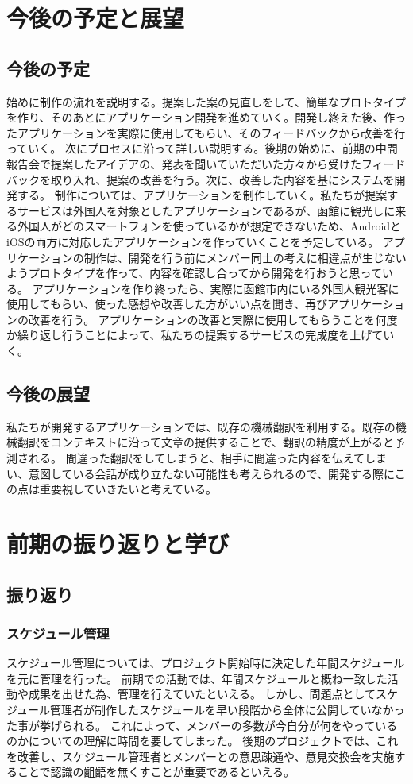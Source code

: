 \documentclass[12pt,papersize]{jsbook}
\begin{document}
\chapter{今後の予定と展望}

\section{今後の予定}
 始めに制作の流れを説明する。提案した案の見直しをして、簡単なプロトタイプを作り、そのあとにアプリケーション開発を進めていく。開発し終えた後、作ったアプリケーションを実際に使用してもらい、そのフィードバックから改善を行っていく。
次にプロセスに沿って詳しい説明する。後期の始めに、前期の中間報告会で提案したアイデアの、発表を聞いていただいた方々から受けたフィードバックを取り入れ、提案の改善を行う。次に、改善した内容を基にシステムを開発する。
制作については、アプリケーションを制作していく。私たちが提案するサービスは外国人を対象としたアプリケーションであるが、函館に観光しに来る外国人がどのスマートフォンを使っているかが想定できないため、AndroidとiOSの両方に対応したアプリケーションを作っていくことを予定している。
アプリケーションの制作は、開発を行う前にメンバー同士の考えに相違点が生じないようプロトタイプを作って、内容を確認し合ってから開発を行おうと思っている。
アプリケーションを作り終ったら、実際に函館市内にいる外国人観光客に使用してもらい、使った感想や改善した方がいい点を聞き、再びアプリケーションの改善を行う。
アプリケーションの改善と実際に使用してもらうことを何度か繰り返し行うことによって、私たちの提案するサービスの完成度を上げていく。

\section{今後の展望}
 私たちが開発するアプリケーションでは、既存の機械翻訳を利用する。既存の機械翻訳をコンテキストに沿って文章の提供することで、翻訳の精度が上がると予測される。
 間違った翻訳をしてしまうと、相手に間違った内容を伝えてしまい、意図している会話が成り立たない可能性も考えられるので、開発する際にこの点は重要視していきたいと考えている。



\chapter{前期の振り返りと学び}
\section{振り返り}
\subsection{スケジュール管理}
 スケジュール管理については、プロジェクト開始時に決定した年間スケジュールを元に管理を行った。
前期での活動では、年間スケジュールと概ね一致した活動や成果を出せた為、管理を行えていたといえる。
しかし、問題点としてスケジュール管理者が制作したスケジュールを早い段階から全体に公開していなかった事が挙げられる。
これによって、メンバーの多数が今自分が何をやっているのかについての理解に時間を要してしまった。
後期のプロジェクトでは、これを改善し、スケジュール管理者とメンバーとの意思疎通や、意見交換会を実施することで認識の齟齬を無くすことが重要であるといえる。
\end{document}
